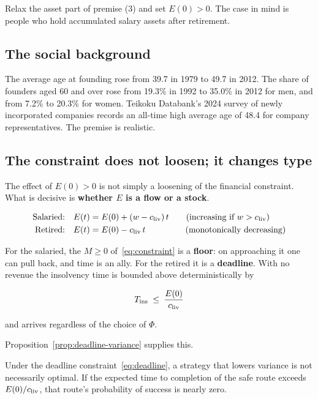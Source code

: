 Relax the asset part of premise (3) and set $E(0)>0$. The case in mind is people who hold
accumulated salary assets after retirement.

\subsection{The social background}

The average age at founding rose from 39.7 in 1979 to 49.7 in 2012. The share of founders
aged 60 and over rose from 19.3\% in 1992 to 35.0\% in 2012 for men, and from 7.2\% to 20.3\%
for women. Teikoku Databank's 2024 survey of newly incorporated companies records an
all-time high average age of 48.4 for company representatives. The premise is realistic.

\subsection{The constraint does not loosen; it changes type}

The effect of $E(0)>0$ is not simply a loosening of the financial constraint. What is
decisive is \textbf{whether $E$ is a flow or a stock}.

\begin{align}
\text{Salaried:}\quad & E(t) = E(0) + (w-c_{\rm liv})\,t \qquad (\text{increasing if } w>c_{\rm liv}) \\
\text{Retired:}\quad & E(t) = E(0) - c_{\rm liv}\,t \qquad\qquad\ \ (\text{monotonically decreasing})
\end{align}

For the salaried, the $M\geq 0$ of~\eqref{eq:constraint} is a \textbf{floor}: on approaching
it one can pull back, and time is an ally. For the retired it is a \textbf{deadline}. With no
revenue the insolvency time is bounded above deterministically by

\begin{equation}
T_{\mathrm{ins}} \;\leq\; \frac{E(0)}{c_{\rm liv}}
\label{eq:deadline}
\end{equation}

and arrives regardless of the choice of $\Phi$.

Proposition~\ref{prop:deadline-variance} supplies this.

\begin{proposition}
Under the deadline constraint~\eqref{eq:deadline}, a strategy that lowers variance is not
necessarily optimal. If the expected time to completion of the safe route exceeds
$E(0)/c_{\rm liv}$, that route's probability of success is nearly zero.
\end{proposition}

